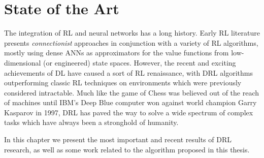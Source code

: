 \chapter{State of the Art}
\label{chapter3_state_of_the_art}
\thispagestyle{empty}

\vspace{0.5cm}

The integration of RL and neural networks has a long history. Early 
RL literature \cite{rummery1994line, tesauro1995temporal, bertsekas1995neuro}
presents \textit{connectionist} approaches in conjunction with a variety
of RL algorithms, mostly using dense ANNs as approximators for the value 
functions from low-dimensional (or engineered) state spaces.
However, the recent and exciting achievements of DL have caused a sort of RL 
renaissance, with DRL algorithms outperforming classic RL techniques on 
environments which were previously considered intractable. 
Much like the game of Chess was believed out of the reach of machines until 
IBM's Deep Blue computer \cite{campbell2002deep} won against world champion 
Garry Kasparov in 1997, DRL has paved the way to solve a wide spectrum of 
complex tasks which have always been a stronghold of humanity. 

In this chapter we present the most important and recent results of DRL research, 
as well as some work related to the algorithm proposed in this thesis.

